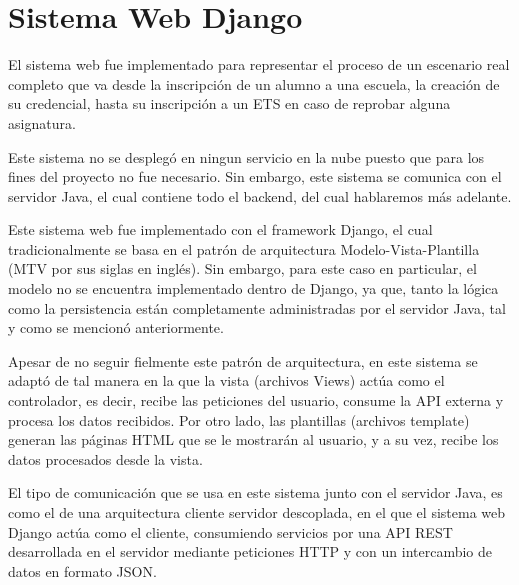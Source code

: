 \section{Sistema Web Django}

El sistema web fue implementado para representar el proceso de un escenario real completo que va desde la inscripción de un alumno a una escuela, la creación de su credencial, hasta su inscripción a un ETS en caso de reprobar alguna asignatura. 

Este sistema no se desplegó en ningun servicio en la nube puesto que para los fines del proyecto no fue necesario. Sin embargo, este sistema se comunica con el servidor Java, el cual contiene todo el backend, del cual hablaremos más adelante.

Este sistema web fue implementado con el framework Django, el cual tradicionalmente se basa en el patrón de arquitectura Modelo-Vista-Plantilla (MTV por sus siglas en inglés). Sin embargo, para este caso en particular, el modelo no se encuentra implementado dentro de Django, ya que, tanto la lógica como la persistencia están completamente administradas por el servidor Java, tal y como se mencionó anteriormente.

Apesar de no seguir fielmente este patrón de arquitectura, en este sistema se adaptó de tal manera en la que la vista (archivos Views) actúa como el controlador, es decir, recibe las peticiones del usuario, consume la API externa y procesa los datos recibidos. Por otro lado, las plantillas (archivos template) generan las páginas HTML que se le mostrarán al usuario, y a su vez, recibe los datos procesados desde la vista.

El tipo de comunicación que se usa en este sistema junto con el servidor Java, es como el de una arquitectura cliente servidor descoplada, en el que el sistema web Django actúa como el cliente, consumiendo servicios por una API REST desarrollada en el servidor mediante peticiones HTTP y con un intercambio de datos en formato JSON.

%
%
%
